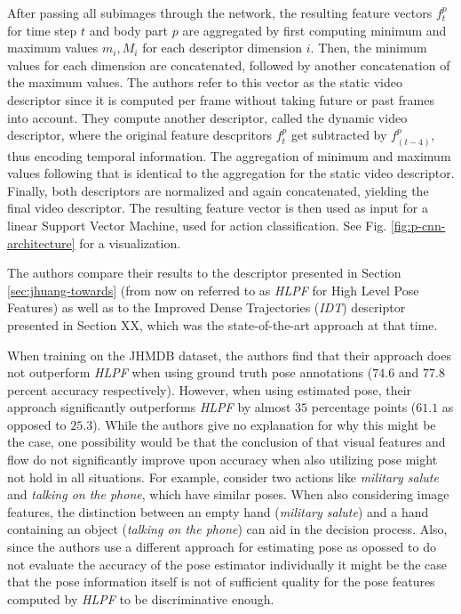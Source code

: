 After passing all subimages through the network, the resulting feature vectors $f_t^p$ for time step $t$ and body part $p$ are aggregated by first computing minimum and maximum values $m_i, M_i$ for each descriptor dimension $i$.
Then, the minimum values for each dimension are concatenated, followed by another concatenation of the maximum values.
The authors refer to this vector as the static video descriptor since it is computed per frame without taking future or past frames into account.
They compute another descriptor, called the dynamic video descriptor, where the original feature descpritors $f_t^p$ get subtracted by $f_(t-4)^p$, thus encoding temporal information.
The aggregation of minimum and maximum values following that is identical to the aggregation for the static video descriptor.
Finally, both descriptors are normalized and again concatenated, yielding the final video descriptor.
The resulting feature vector is then used as input for a linear Support Vector Machine, used for action classification.
See Fig. \ref{fig:p-cnn-architecture} for a visualization.

The authors compare their results to the descriptor presented in Section \ref{sec:jhuang-towards} (from now on referred to as \textit{HLPF} for High Level Pose Features) as well as to the Improved Dense Trajectories (\textit{IDT}) descriptor presented in Section XX, which was the state-of-the-art approach at that time. %

When training on the JHMDB dataset, the authors find that their approach does not outperform \textit{HLPF} when using ground truth pose annotations ($74.6$ and $77.8$ percent accuracy respectively).
However, when using estimated pose, their approach significantly outperforms \textit{HLPF} by almost $35$ percentage points ($61.1$ as opposed to $25.3$).
While the authors give no explanation for why this might be the case, one possibility would be that the conclusion of \cite{jhuang_towards_2013} that visual features and flow do not significantly improve upon accuracy when also utilizing pose might not hold in all situations.
For example, consider two actions like \textit{military salute} and \textit{talking on the phone}, which have similar poses.
When also considering image features, the distinction between an empty hand (\textit{military salute}) and a hand containing an object (\textit{talking on the phone}) can aid in the decision process.
Also, since the authors use a different approach for estimating pose as opossed to \cite{jhuang_towards_2013}  do not evaluate the accuracy of the pose estimator individually it might be the case that the pose information itself is not of sufficient quality for the pose features computed by \textit{HLPF} to be discriminative enough.

